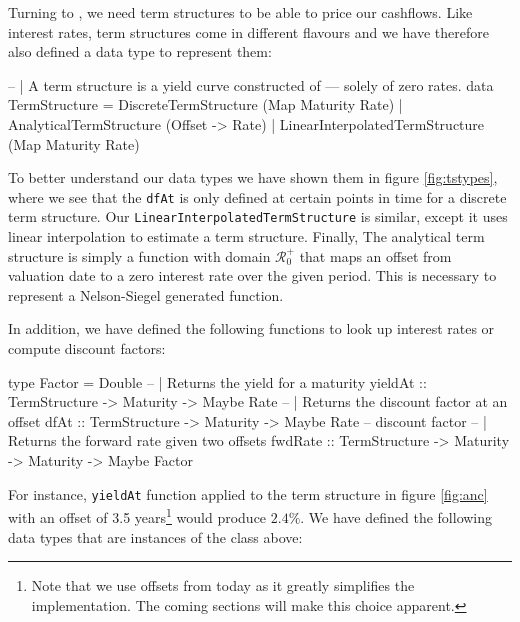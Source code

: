 Turning to \hql, we need term structures to be able to price our cashflows.
Like interest rates, term structures come in different flavours and we 
have therefore also defined a data type to represent them:

\begin{hscode}
-- | A term structure is a yield curve constructed of
--- solely of zero rates.
data TermStructure = DiscreteTermStructure (Map Maturity Rate)
                   | AnalyticalTermStructure (Offset -> Rate)
                   | LinearInterpolatedTermStructure (Map Maturity Rate)
\end{hscode}


To better understand our data types we have shown them in figure \ref{fig:tstypes},
where we see that the \texttt{dfAt} is only defined at certain points in time for
a discrete term structure. Our \texttt{LinearInterpolatedTermStructure} is similar,
except it uses linear interpolation to estimate a term structure.
Finally, The analytical term structure is simply a function with domain $\mathcal{R}^+_0$
that maps an offset from valuation date to a zero interest rate over the given
period. This is necessary to represent a Nelson-Siegel generated function\cite{cmunk}.

In addition, we have defined the following functions to look up interest rates
or compute discount factors:

\begin{hscode}
type Factor = Double
-- | Returns the yield for a maturity
yieldAt :: TermStructure -> Maturity -> Maybe Rate
-- | Returns the discount factor at an offset
dfAt :: TermStructure -> Maturity -> Maybe Rate -- discount factor
-- | Returns the forward rate given two offsets
fwdRate :: TermStructure -> Maturity -> Maturity -> Maybe Factor
\end{hscode}

For instance, \texttt{yieldAt} function applied to the term structure in
figure \ref{fig:anc} with an offset of 3.5 years\footnote{Note that we use
offsets from today as it greatly simplifies the implementation. The coming 
sections will make this choice apparent.} would produce $2.4\%$. We have
defined the following data types that are instances of the class above:

